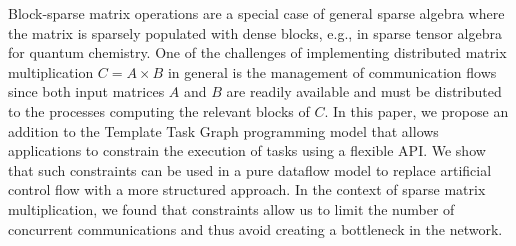 Block-sparse matrix operations are a special case of general sparse algebra where the matrix is sparsely populated with dense blocks, e.g., in sparse tensor algebra for quantum chemistry. One of the challenges of implementing distributed matrix multiplication $C = A\times B$ in general is the management of communication flows since both input matrices $A$ and $B$ are readily available and must be distributed to the processes computing the relevant blocks of $C$. In this paper, we propose an addition to the Template Task Graph programming model that allows applications to constrain the execution of tasks using a flexible API. We show that such constraints can be used in a pure dataflow model to replace artificial control flow with a more structured approach. In the context of sparse matrix multiplication, we found that constraints allow us to limit the number of concurrent communications and thus avoid creating a bottleneck in the network.
